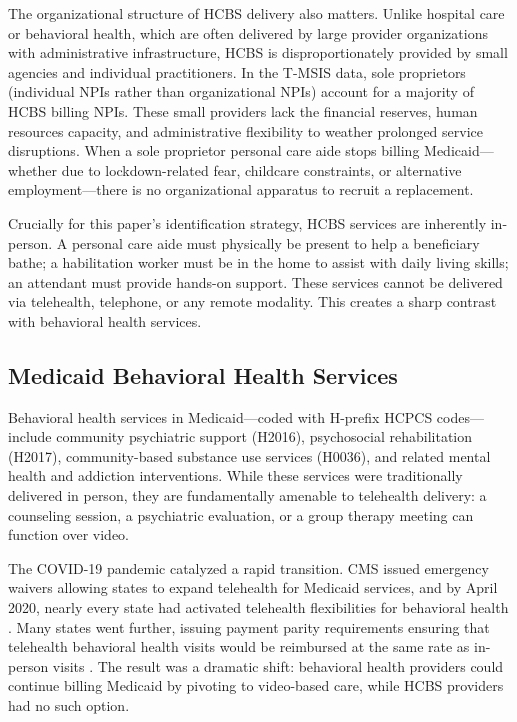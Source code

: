 \documentclass[12pt]{article}
\begin{document}
The organizational structure of HCBS delivery also matters. Unlike hospital care or behavioral health, which are often delivered by large provider organizations with administrative infrastructure, HCBS is disproportionately provided by small agencies and individual practitioners. In the T-MSIS data, sole proprietors (individual NPIs rather than organizational NPIs) account for a majority of HCBS billing NPIs. These small providers lack the financial reserves, human resources capacity, and administrative flexibility to weather prolonged service disruptions. When a sole proprietor personal care aide stops billing Medicaid---whether due to lockdown-related fear, childcare constraints, or alternative employment---there is no organizational apparatus to recruit a replacement.

Crucially for this paper's identification strategy, HCBS services are inherently in-person. A personal care aide must physically be present to help a beneficiary bathe; a habilitation worker must be in the home to assist with daily living skills; an attendant must provide hands-on support. These services cannot be delivered via telehealth, telephone, or any remote modality. This creates a sharp contrast with behavioral health services.

\subsection{Medicaid Behavioral Health Services}

Behavioral health services in Medicaid---coded with H-prefix HCPCS codes---include community psychiatric support (H2016), psychosocial rehabilitation (H2017), community-based substance use services (H0036), and related mental health and addiction interventions. While these services were traditionally delivered in person, they are fundamentally amenable to telehealth delivery: a counseling session, a psychiatric evaluation, or a group therapy meeting can function over video.

The COVID-19 pandemic catalyzed a rapid transition. CMS issued emergency waivers allowing states to expand telehealth for Medicaid services, and by April 2020, nearly every state had activated telehealth flexibilities for behavioral health \citep{cms2020telehealth}. Many states went further, issuing payment parity requirements ensuring that telehealth behavioral health visits would be reimbursed at the same rate as in-person visits \citep{ncsl2021telehealth}. The result was a dramatic shift: behavioral health providers could continue billing Medicaid by pivoting to video-based care, while HCBS providers had no such option.
\end{document}
